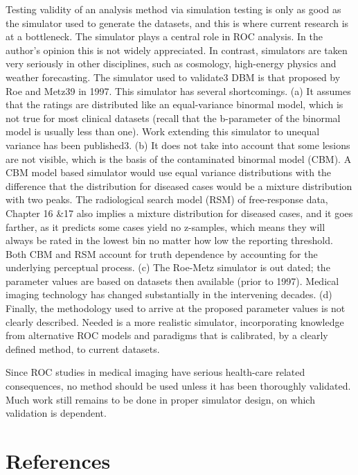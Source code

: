 \documentclass[
]{book}
\begin{document}
Testing validity of an analysis method via simulation testing is only as good as the simulator used to generate the datasets, and this is where current research is at a bottleneck. The simulator plays a central role in ROC analysis. In the author's opinion this is not widely appreciated. In contrast, simulators are taken very seriously in other disciplines, such as cosmology, high-energy physics and weather forecasting. The simulator used to validate3 DBM is that proposed by Roe and Metz39 in 1997. This simulator has several shortcomings. (a) It assumes that the ratings are distributed like an equal-variance binormal model, which is not true for most clinical datasets (recall that the b-parameter of the binormal model is usually less than one). Work extending this simulator to unequal variance has been published3. (b) It does not take into account that some lesions are not visible, which is the basis of the contaminated binormal model (CBM). A CBM model based simulator would use equal variance distributions with the difference that the distribution for diseased cases would be a mixture distribution with two peaks. The radiological search model (RSM) of free-response data, Chapter 16 \&17 also implies a mixture distribution for diseased cases, and it goes farther, as it predicts some cases yield no z-samples, which means they will always be rated in the lowest bin no matter how low the reporting threshold. Both CBM and RSM account for truth dependence by accounting for the underlying perceptual process. (c) The Roe-Metz simulator is out dated; the parameter values are based on datasets then available (prior to 1997). Medical imaging technology has changed substantially in the intervening decades. (d) Finally, the methodology used to arrive at the proposed parameter values is not clearly described. Needed is a more realistic simulator, incorporating knowledge from alternative ROC models and paradigms that is calibrated, by a clearly defined method, to current datasets.

Since ROC studies in medical imaging have serious health-care related consequences, no method should be used unless it has been thoroughly validated. Much work still remains to be done in proper simulator design, on which validation is dependent.

\hypertarget{DBMAnalysisBkgrnd-references}{%
\section{References}\label{DBMAnalysisBkgrnd-references}}
\end{document}
